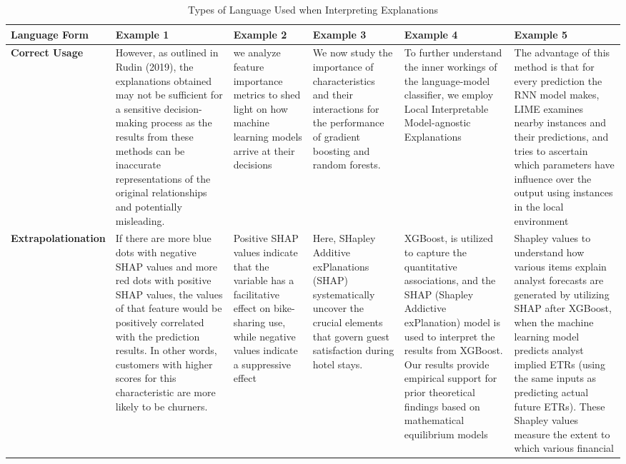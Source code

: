 \documentclass[mnsc,blindrev]{informs3}
\begin{document}
    \begin{landscape}
   \begin{table}[htbp] 
    \tiny
    \caption{Types of Language Used when Interpreting Explanations}
    \begin{tabu} to 1\linewidth { | X[l] | X[l] | X[l] | X[l] | X[l] | X[l] |}
       \hline
       \textbf{Language Form} & \textbf{Example 1} & \textbf{Example 2} & \textbf{Example 3}& \textbf{Example 4} & \textbf{Example 5}\\
       \hline
       \textbf{Correct Usage} 
       & However, as outlined in Rudin (2019), the explanations obtained may not be sufficient for a sensitive decision-making process as the results from these methods can be inaccurate representations of the original relationships and potentially misleading. 
       & we analyze feature importance metrics to shed light on how machine learning models arrive at their decisions 
       & We now study the importance of characteristics and their interactions for the performance of gradient boosting and random forests. 
       & To further understand the inner workings of the language-model classifier, we employ Local Interpretable Model-agnostic Explanations 
       & The advantage of this method is that for every prediction the RNN model makes, LIME examines nearby instances and their predictions, and tries to ascertain which parameters have influence over the output using instances in the local environment  \\ \hline 
       \textbf{Extrapolationation}
       & If there are more blue dots with negative SHAP values and more red dots with positive SHAP values, the
values of that feature would be positively correlated with the prediction results. In other words, customers with higher scores for this characteristic are more likely to be churners. 
       & Positive SHAP values indicate that the variable has a facilitative effect on bike-sharing use, while negative values indicate a suppressive effect
       & Here, SHapley Additive exPlanations (SHAP) systematically uncover the crucial elements that govern guest satisfaction during hotel stays.
       & XGBoost, is utilized to capture the quantitative associations, and the SHAP (Shapley Addictive exPlanation) model is used to interpret the results from XGBoost. Our results provide empirical support for prior theoretical findings based on mathematical equilibrium models  
       & Shapley values to understand how various items explain analyst forecasts are generated by utilizing SHAP after XGBoost, when the machine learning model predicts analyst implied ETRs (using the same inputs as predicting actual future ETRs). These Shapley values measure the extent to which various financial

\end{tabu}
\end{table}
\end{landscape}
\end{document}
